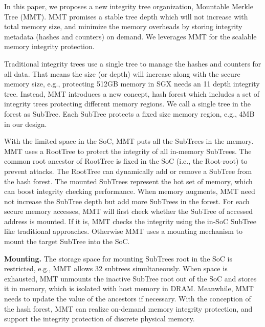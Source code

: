 
\begin{bigabstract}
  In this paper, we proposes a new integrity tree organization, Mountable Merkle Tree (MMT). MMT promises a stable tree depth which will not increase with total memory size, and minimize the memory overheads by storing integrity metadata 
  (hashes and counters) on demand. We leverages MMT for the scalable memory integrity protection.

  Traditional integrity trees use a single tree to manage the hashes and counters for all data. That means the size (or depth) will increase along with the secure memory size, e.g., protecting 512GB memory in SGX needs an 11 depth integrity tree. Instead, 
  MMT introduces a new concept, hash forest which includes a set of integrity trees protecting different memory regions. We call a single tree in the forest as SubTree. Each SubTree protects a fixed size memory region, e.g., 4MB in our design.

  With the limited space in the SoC, MMT puts all the SubTrees in the memory. MMT uses a RootTree to protect the integrity of all in-memory SubTrees.
  The common root ancestor of RootTree is fixed in the SoC (i.e., the Root-root) to prevent attacks. The RootTree can dynamically add or remove a
  SubTree from the hash forest. The mounted SubTrees represent the hot set of memory, which can boost integrity checking performance. When memory augments, MMT need not increase the SubTree depth but add more SubTrees in the forest. For each secure memory accesses, MMT will first check
  whether the SubTree of accessed address is mounted. If it is, MMT checks the integrity using the in-SoC SubTree like traditional approaches. Otherwise MMT uses a mounting mechanism to mount the target SubTree into the SoC.

  \textbf{Mounting.} The storage space for mounting SubTrees root in
  the SoC is restricted, e.g., MMT allows 32 subtrees simultaneously. When space is exhausted, MMT unmounts the
  inactive SubTree root out of the SoC and stores it in memory,
  which is isolated with host memory in DRAM. Meanwhile,
  MMT needs to update the value of the ancestors if necessary.
  With the conception of the hash forest, MMT can realize on-demand memory integrity protection, and support the
  integrity protection of discrete physical memory.


\end{bigabstract}
